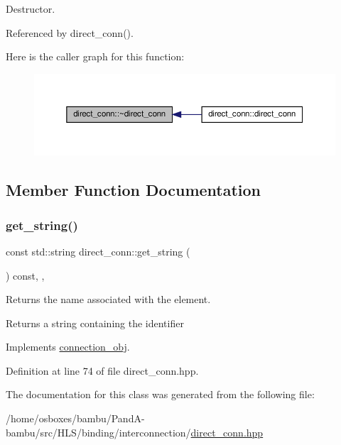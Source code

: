 Destructor. 



Referenced by direct\+\_\+conn().

Here is the caller graph for this function\+:
\nopagebreak
\begin{figure}[H]
\begin{center}
\leavevmode
\includegraphics[width=350pt]{d2/dac/classdirect__conn_ae86d358d318711ea9e3cf6f658f75e07_icgraph}
\end{center}
\end{figure}


\subsection{Member Function Documentation}
\mbox{\label{classdirect__conn_a4c6df2aa88c8c522a1aee042ff58a0c3}} 
\subsubsection{\texorpdfstring{get\+\_\+string()}{get\_string()}}
{\footnotesize\ttfamily const std\+::string direct\+\_\+conn\+::get\+\_\+string (\begin{DoxyParamCaption}{ }\end{DoxyParamCaption}) const\hspace{0.3cm}{\ttfamily [inline]}, {\ttfamily [override]}, {\ttfamily [virtual]}}



Returns the name associated with the element. 

\begin{DoxyReturn}{Returns}
a string containing the identifier 
\end{DoxyReturn}


Implements \hyperlink{classconnection__obj_a9d68f6173578ed258c9a6477b2e4b408}{connection\+\_\+obj}.



Definition at line 74 of file direct\+\_\+conn.\+hpp.



The documentation for this class was generated from the following file\+:\begin{DoxyCompactItemize}
\item 
/home/osboxes/bambu/\+Pand\+A-\/bambu/src/\+H\+L\+S/binding/interconnection/\hyperlink{direct__conn_8hpp}{direct\+\_\+conn.\+hpp}\end{DoxyCompactItemize}
